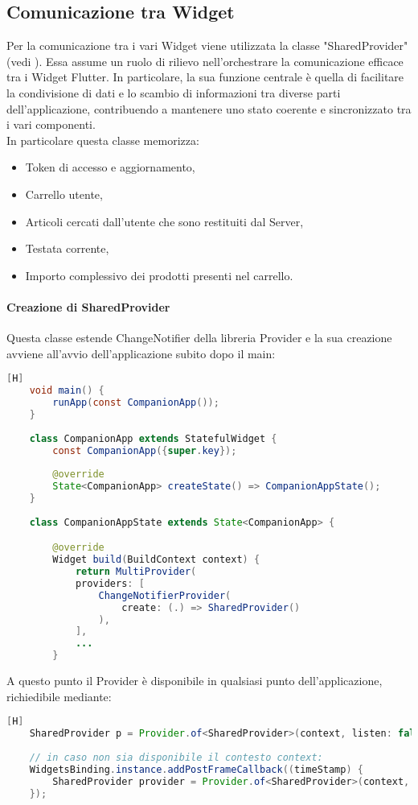 \subsection{Comunicazione tra Widget} \label{lab_widget_communication}
Per la comunicazione tra i vari Widget viene utilizzata la classe "SharedProvider" (vedi ). Essa assume un ruolo di rilievo nell'orchestrare la comunicazione efficace tra i Widget Flutter. In particolare, la sua funzione centrale è quella di facilitare la condivisione di dati e lo scambio di informazioni tra diverse parti dell'applicazione, contribuendo a mantenere uno stato coerente e sincronizzato tra i vari componenti.\\
In particolare questa classe memorizza:
\begin{itemize}
	\item Token di accesso e aggiornamento,
	\item Carrello utente,
	\item Articoli cercati dall'utente che sono restituiti dal Server,
	\item Testata corrente,
	\item Importo complessivo dei prodotti presenti nel carrello.
\end{itemize}

\noindent
\paragraph{Creazione di SharedProvider}
Questa classe estende ChangeNotifier della libreria Provider e la sua creazione avviene all'avvio dell'applicazione subito dopo il main:
\begin{lstlisting}[language=Java, firstnumber=1][H]
	void main() {
		runApp(const CompanionApp());
	}
	
	class CompanionApp extends StatefulWidget {
		const CompanionApp({super.key});
		
		@override
		State<CompanionApp> createState() => CompanionAppState();
	}
	
	class CompanionAppState extends State<CompanionApp> {

		@override
		Widget build(BuildContext context) {
			return MultiProvider(
			providers: [
				ChangeNotifierProvider(
					create: (.) => SharedProvider()
				),
			],
			...
		}
\end{lstlisting}

\noindent
A questo punto il Provider è disponibile in qualsiasi punto dell'applicazione, richiedibile mediante:
\begin{lstlisting}[language=Java, style=longBlock, firstnumber=1][H]
	SharedProvider p = Provider.of<SharedProvider>(context, listen: false);
	
	// in caso non sia disponibile il contesto context:
	WidgetsBinding.instance.addPostFrameCallback((timeStamp) {
		SharedProvider provider = Provider.of<SharedProvider>(context, listen: false);
	});
\end{lstlisting}

